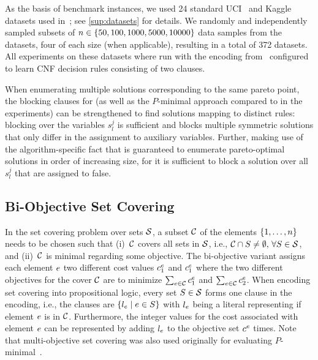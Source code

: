 As the basis of benchmark instances, we used
24 standard UCI~\autocite{UciMlr} and Kaggle datasets %
used in~\textcite{DBLP:conf/cp/MaliotovM18}; see \cref{sup:datasets} for details.
We randomly and independently sampled subsets of $n\in\{50,100,1000,5000,10000\}$ data samples from the datasets, four of each size (when applicable), resulting in a
total of 372 datasets. %
All experiments on these datasets where run with the encoding from~\textcite{DBLP:conf/cp/MaliotovM18} configured to learn CNF decision rules consisting of two clauses.

When enumerating multiple solutions corresponding to the same pareto point, the blocking clauses for \algname{} (as
well as the $P$-minimal approach compared to in the experiments) can be strengthened
to find solutions mapping to distinct rules: blocking over the variables $s_l^j$ is sufficient and blocks multiple
symmetric solutions that only differ in the assignment to auxiliary variables.
Further, making use of the algorithm-specific fact that \algname{} is guaranteed to enumerate pareto-optimal solutions in order of increasing size,
for \algname{} it is sufficient to block a solution over all $s_l^j$ that are assigned to false.

\subsection{Bi-Objective Set Covering}

In the set covering problem over sets $\mathcal{S}$, a subset $\mathcal{C}$ of the elements $\{1,\dots,n\}$ needs to be
chosen such that (i)~$\mathcal{C}$ covers all sets in $\mathcal{S}$, i.e., $\mathcal{C}\cap S\neq\emptyset,\,\forall S\in\mathcal{S}$, and (ii)~$\mathcal{C}$ is minimal regarding some objective.
The bi-objective variant assigns each element $e$ two different cost values $c^e_1$ and $c^e_1$ where the two
different objectives for the cover $\mathcal{C}$ are to minimize $\sum_{e\in\mathcal{C}}c^e_1$ and $\sum_{e\in\mathcal{C}}c^e_2$.
When encoding set covering into propositional logic, every set $S\in\mathcal{S}$ forms one clause in the encoding, i.e., the clauses are $\{l_e \mid e\in S\}$
with $l_e$ being a literal representing if element $e$ is in $\mathcal{C}$.
Furthermore, the integer values for the cost associated with element $e$ can be represented by adding $l_e$ to the objective set $c^e$ times.
Note that multi-objective set covering was also used originally for evaluating $P$-minimal~\autocite{DBLP:conf/cp/SohBTB17}.

